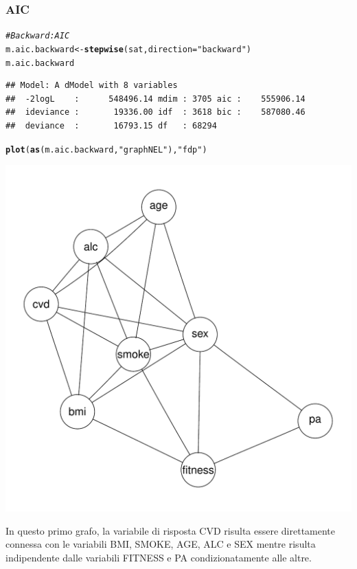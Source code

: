 \documentclass{article}\usepackage[]{graphicx}\usepackage[]{xcolor}
\makeatletter
\def\maxwidth{ %
  \ifdim\Gin@nat@width>\linewidth
    \linewidth
  \else
    \Gin@nat@width
  \fi
}
\newcommand{\hlstr}[1]{\textcolor[rgb]{0.192,0.494,0.8}{#1}}%
\newcommand{\hlcom}[1]{\textcolor[rgb]{0.678,0.584,0.686}{\textit{#1}}}%
\newcommand{\hlstd}[1]{\textcolor[rgb]{0.345,0.345,0.345}{#1}}%
\newcommand{\hlkwb}[1]{\textcolor[rgb]{0.69,0.353,0.396}{#1}}%
\newcommand{\hlkwc}[1]{\textcolor[rgb]{0.333,0.667,0.333}{#1}}%
\newcommand{\hlkwd}[1]{\textcolor[rgb]{0.737,0.353,0.396}{\textbf{#1}}}%
\newenvironment{kframe}{%
 \def\at@end@of@kframe{}%
 \ifinner\ifhmode%
  \def\at@end@of@kframe{\end{minipage}}%
  \begin{minipage}{\columnwidth}%
 \fi\fi%
 \def\FrameCommand##1{\hskip\@totalleftmargin \hskip-\fboxsep
 \colorbox{shadecolor}{##1}\hskip-\fboxsep
     \hskip-\linewidth \hskip-\@totalleftmargin \hskip\columnwidth}%
 \MakeFramed {\advance\hsize-\width
   \@totalleftmargin\z@ \linewidth\hsize
   \@setminipage}}%
 {\par\unskip\endMakeFramed%
 \at@end@of@kframe}
\newenvironment{knitrout}{}{} %
\makeatother
\begin{document}
    \subsubsection{AIC}
\begin{knitrout}
\color{fgcolor}\begin{kframe}
\begin{alltt}
\hlcom{#Backward:AIC}
\hlstd{m.aic.backward} \hlkwb{<-} \hlkwd{stepwise}\hlstd{(sat,} \hlkwc{direction}\hlstd{=}\hlstr{"backward"}\hlstd{)}
\hlstd{m.aic.backward}
\end{alltt}
\begin{verbatim}
## Model: A dModel with 8 variables
##  -2logL    :      548496.14 mdim : 3705 aic :    555906.14 
##  ideviance :       19336.00 idf  : 3618 bic :    587080.46 
##  deviance  :       16793.15 df   : 68294
\end{verbatim}
\begin{alltt}
\hlkwd{plot}\hlstd{(}\hlkwd{as}\hlstd{(m.aic.backward,} \hlstr{"graphNEL"}\hlstd{),} \hlstr{"fdp"}\hlstd{)}
\end{alltt}
\end{kframe}
\includegraphics[width=\maxwidth]{figure/Grafo_AIC_Backward-1} 
\end{knitrout}
      
      In questo primo grafo, la variabile di risposta CVD risulta essere
      direttamente connessa con le variabili BMI, SMOKE, AGE, ALC e SEX mentre
      risulta indipendente dalle variabili FITNESS e PA condizionatamente alle
      altre.
      
\end{document}
